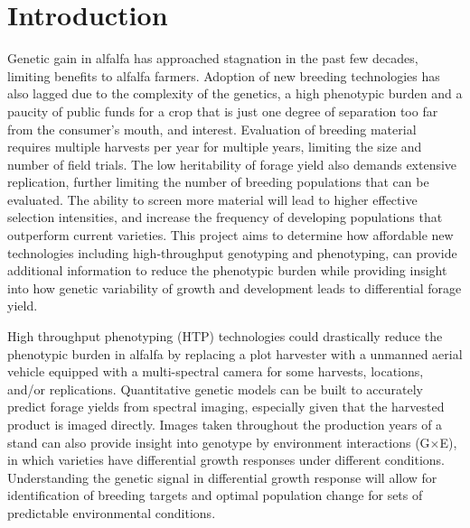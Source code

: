 \documentclass[12pt, letterpaper]{article}
\newcommand{\GxE}{G$\times$E}
\begin{document}
\section{Introduction}


Genetic gain in alfalfa has approached stagnation in the past few decades, limiting benefits to alfalfa farmers. Adoption of new breeding technologies has also lagged due to the complexity of the genetics, a high phenotypic burden and a paucity of public funds for a crop that is just one degree of separation too far from the consumer's mouth, and interest. Evaluation of breeding material requires multiple harvests per year for multiple years, limiting the size and number of field trials. The low heritability of forage yield also demands extensive replication, further limiting the number of breeding populations that can be evaluated. The ability to screen more material will lead to higher effective selection intensities, and increase the frequency of developing populations that outperform current varieties. This project aims to determine how affordable new technologies including high-throughput genotyping and phenotyping, can provide additional information to reduce the phenotypic burden while providing insight into how genetic variability of growth and development leads to differential forage yield. 

High throughput phenotyping (HTP) technologies could drastically reduce the phenotypic burden in alfalfa by replacing a plot harvester with a unmanned aerial vehicle equipped with a multi-spectral camera for some harvests, locations, and/or replications. Quantitative genetic models can be built to accurately predict forage yields from spectral imaging, especially given that the harvested product is imaged directly. Images taken throughout the production years of a stand can also provide insight into genotype by environment interactions (\GxE), in which varieties have differential growth responses under different conditions. Understanding the genetic signal in differential growth response will allow for identification of breeding targets and optimal population change for sets of predictable environmental conditions. 

\end{document}

